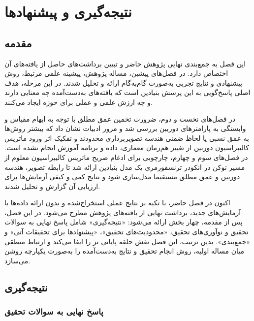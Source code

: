 \chapter{نتیجه‌گیری و پیشنهادها}
\thispagestyle{fancy}\clearpage

\section{مقدمه}
\label{sec:chapter5_intro}

این فصل به جمع‌بندی نهایی پژوهش حاضر و تبیین برداشت‌های حاصل از یافته‌های آن اختصاص دارد.
در فصل‌های پیشین، مساله پژوهش، پیشینه علمی مرتبط، روش پیشنهادی و نتایج تجربی
به‌صورت گام‌به‌گام ارائه و تحلیل شدند.
در این مرحله، هدف اصلی پاسخ‌گویی به این پرسش بنیادین است که
یافته‌های به‌دست‌آمده چه معنایی دارند
و چه ارزش علمی و عملی برای حوزه  ایجاد می‌کنند.

در فصل‌های نخست و دوم، ضرورت تخمین عمق مطلق با توجه به ابهام مقیاس و وابستگی به پارامترهای دوربین بررسی شد و مرور ادبیات نشان داد که بیشتر روش‌ها به عمق نسبی یا لحاظ ضمنی هندسه تصویربرداری محدودند و تفکیک اثر ورود ماتریس کالیبراسیون دوربین از تغییر هم‌زمان معماری، داده و برنامه آموزش انجام نشده است. در فصل‌های سوم و چهارم، چارچوبی برای ادغام صریح ماتریس کالیبراسیون معلوم از مسیر توکن در انکودر ترنسفورمری یک مدل بنیادین ارائه شد تا رابطه تصویر، هندسه دوربین و عمق مطلق مستقیما مدل‌سازی شود و نتایج کمی و کیفی آزمایش‌ها برای ارزیابی آن گزارش و تحلیل شدند.

اکنون در فصل حاضر،
با تکیه بر نتایج عملی استخراج‌شده
و بدون ارائه داده‌ها یا آزمایش‌های جدید،
برداشت نهایی از یافته‌های پژوهش مطرح می‌شود.
در این فصل، پس از مقدمه، چهار بخش ارائه می‌شود: «نتیجه‌گیری» شامل پاسخ نهایی به سوالات تحقیق و نوآوری‌های تحقیق، «محدودیت‌های تحقیق»، «پیشنهادها برای تحقیقات آتی» و «جمع‌بندی».
بدین ترتیب، این فصل نقش حلقه پایانی تز را ایفا می‌کند
و ارتباط منطقی میان مساله اولیه،
روش انجام تحقیق
و نتایج به‌دست‌آمده را به‌صورت یکپارچه روشن می‌سازد.


\section[نتیجه‌گیری]{نتیجه‌گیری}
\label{sec:chapter5_conclusion}

\subsection{پاسخ نهایی به سوالات تحقیق}
\label{sec:chapter5_research_questions_answers}

